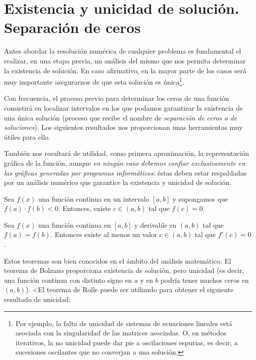 \section{Existencia y unicidad de solución. Separación de ceros}
\label{sec:tema1:exist-y-unic}

Antes abordar la resolución numérica de cualquier problema es
fundamental el realizar, en una etapa previa, un análisis del mismo
que nos permita determinar la existencia de solución. En caso
afirmativo, en la mayor parte de los casos será muy importante
asegurarnos de que esta solución es única\footnote{Por ejemplo,
  la falta de unicidad de sistemas de ecuaciones lineales está
  asociada con la singularidad de las matrices asociadas. O, en
  métodos iterativos, la no unicidad puede dar pie a
  oscilaciones espurias, es decir, a sucesiones oscilantes que no
  converjan a una solución.}.

Con frecuencia, el proceso previo para determinar los ceros de una
función consistirá en localizar intervalos en los que podamos
garantizar la existencia de una única solución (proceso que recibe el
nombre de \textit{separación de ceros o de soluciones}). Los
siguientes resultados nos proporcionan unas herramientas muy útiles
para ello.

También nos resultará de utilidad, como primera aproximación, la
representación gráfica de la función, aunque \textit{en ningún caso
  debemos confiar exclusivamente en las gráficas generadas por
  programas informáticos}: éstas deben estar respaldadas por un
análisis numérico que garantice la existencia y unicidad de solución.

\begin{theorem}[Bolzano]
  \label{thm:bolzano}
  Sea $f(x)$ una función continua en un intervalo $[a, b]$ y
  supongamos que $f (a)\cdot f (b) < 0$.  Entonces, existe
  $c\in(a, b)$ tal que $f (c) = 0$.
\end{theorem}

\begin{theorem}[Rolle]
  \label{thm:rolle}
  Sea $f(x)$ una función continua en $[a, b]$ y derivable en
  $(a, b)$ tal que $f(a) = f(b)$.
  Entonces existe al menos un valor $c \in (a, b)$ tal que $f'(c) = 0$.
\end{theorem}

Estos teoremas son bien conocidos en el ámbito del análisis
matemático. El teorema de Bolzano proporciona existencia de solución,
pero unicidad (es decir, una función continua con distinto signo en
$a$ y en $b$ podría tener muchos ceros en $(a,b)$). <El teorema de
Rolle puede ser utilizado para obtener el siguiente resultado de
unicidad:

